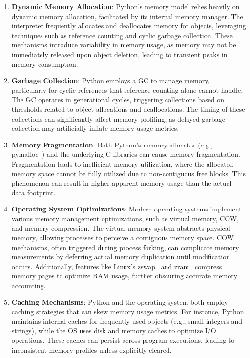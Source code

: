 \begin{enumerate}
    \item \textbf{Dynamic Memory Allocation}:
    Python's memory model relies heavily on dynamic memory allocation, facilitated by its internal memory manager.
    The interpreter frequently allocates and deallocates memory for objects, leveraging techniques such as reference counting and cyclic garbage collection.
    These mechanisms introduce variability in memory usage, as memory may not be immediately released upon object deletion, leading to transient peaks in memory consumption.

    \item \textbf{Garbage Collection}:
    Python employs a \ac{GC} to manage memory, particularly for cyclic references that reference counting alone cannot handle.
    The \ac{GC} operates in generational cycles, triggering collections based on thresholds related to object allocations and deallocations.
    The timing of these collections can significantly affect memory profiling, as delayed garbage collection may artificially inflate memory usage metrics.

    \item \textbf{Memory Fragmentation}:
    Both Python's memory allocator (e.g., pymalloc~\cite{pymalloc}) and the underlying C libraries can cause memory fragmentation.
    Fragmentation leads to inefficient memory utilization, where the allocated memory space cannot be fully utilized due to non-contiguous free blocks.
    This phenomenon can result in higher apparent memory usage than the actual data footprint.

    \item \textbf{Operating System Optimizations}:
    Modern operating systems implement various memory management optimizations, such as virtual memory, \ac{COW}, and memory compression.
    The virtual memory system abstracts physical memory, allowing processes to perceive a contiguous memory space.
    \ac{COW} mechanisms, often triggered during process forking, can complicate memory measurements by deferring actual memory duplication until modification occurs.
    Additionally, features like Linux's zswap~\cite{zswap} and zram~\cite{zram} compress memory pages to optimize \ac{RAM} usage, further obscuring accurate memory accounting.

    \item \textbf{Caching Mechanisms}:
    Python and the operating system both employ caching strategies that can skew memory usage metrics.
    For instance, Python maintains internal caches for frequently used objects (e.g., small integers and strings), while the \ac{OS} uses disk and memory caches to optimize \ac{I/O} operations.
    These caches can persist across program executions, leading to inconsistent memory profiles unless explicitly cleared.


\end{enumerate}
